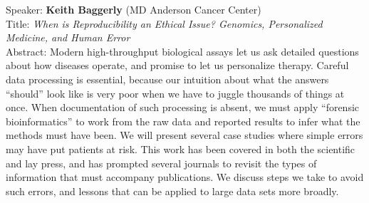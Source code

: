 \documentclass[11pt]{article}
\begin{document}
\bigskip
\noindent
Speaker: {\bf Keith Baggerly} (MD Anderson Cancer Center)\\
Title: {\it When is Reproducibility an Ethical Issue? Genomics, Personalized Medicine, and Human Error}\\
Abstract: Modern high-throughput biological assays let us ask detailed
questions about how diseases operate, and promise to let us
personalize therapy. Careful data processing is essential, because our
intuition about what the answers “should” look like is very poor when
we have to juggle thousands of things at once. When documentation of
such processing is absent, we must apply “forensic bioinformatics” to
work from the raw data and reported results to infer what the methods
must have been. We will present several case studies where simple
errors may have put patients at risk. This work has been covered in
both the scientific and lay press, and has prompted several journals
to revisit the types of information that must accompany
publications. We discuss steps we take to avoid such errors, and
lessons that can be applied to large data sets more broadly.
\end{document}
